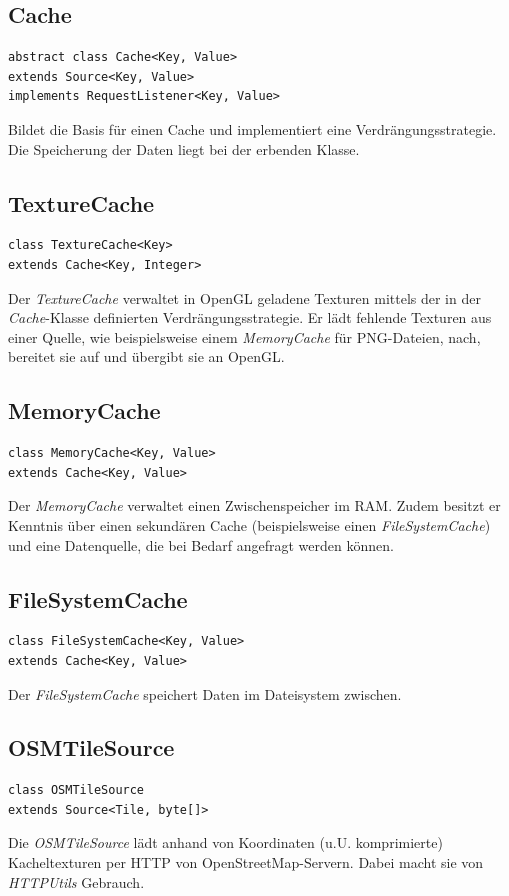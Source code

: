\documentclass[10pt]{scrreprt}
\begin{document}
\subsection*{Cache}
\begin{lstlisting}
abstract class Cache<Key, Value> 
extends Source<Key, Value>
implements RequestListener<Key, Value>
\end{lstlisting}
Bildet die Basis für einen Cache und implementiert eine Verdrängungsstrategie. Die Speicherung der Daten liegt bei der erbenden Klasse.
\\

\subsection*{TextureCache}
\begin{lstlisting}
class TextureCache<Key>
extends Cache<Key, Integer>
\end{lstlisting}
Der \textit{TextureCache} verwaltet in OpenGL geladene Texturen mittels der in der \textit{Cache}-Klasse definierten Verdrängungsstrategie. Er lädt fehlende Texturen aus einer Quelle, wie beispielsweise einem \textit{MemoryCache} für PNG-Dateien, nach, bereitet sie auf und übergibt sie an OpenGL. 
\\

\subsection*{MemoryCache}
\begin{lstlisting}
class MemoryCache<Key, Value>
extends Cache<Key, Value>
\end{lstlisting}
Der \textit{MemoryCache} verwaltet einen Zwischenspeicher im RAM. Zudem besitzt er Kenntnis über einen sekundären Cache (beispielsweise einen \textit{FileSystemCache}) und eine Datenquelle, die bei Bedarf angefragt werden können.
\\

\subsection*{FileSystemCache}
\begin{lstlisting}
class FileSystemCache<Key, Value>
extends Cache<Key, Value>
\end{lstlisting}
Der \textit{FileSystemCache} speichert Daten im Dateisystem zwischen.
\\

\subsection*{OSMTileSource}
\begin{lstlisting}
class OSMTileSource
extends Source<Tile, byte[]>
\end{lstlisting}
Die \textit{OSMTileSource} lädt anhand von Koordinaten (u.U. komprimierte) Kacheltexturen per HTTP von OpenStreetMap-Servern. Dabei macht sie von \textit{HTTPUtils} Gebrauch.\\
\end{document}
